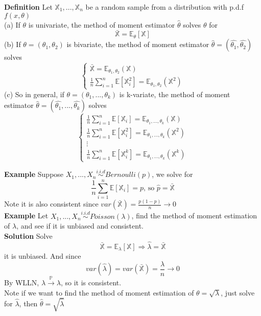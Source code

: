 \documentclass[a4paper,12pt]{article}
\begin{document}
\textbf{Definition} Let $\mathbb{X}_1, ..., \mathbb{X}_n$ be a random sample from a distribution with p.d.f $f(x, \theta)$\\
(a) If $\theta$ is univariate, the method of moment estimator $\hat{\theta}$ solves $\theta$ for $$\bar{\mathbb{X}} = \mathbb{E}_\theta[\mathbb{X}]$$
(b) If $\theta = (\theta_1, \theta_2)$ is bivariate, the method of moment estimator $\hat{\theta} = (\hat{\theta_1}, \hat{\theta_2})$ solves
$$\begin{cases}
\bar{\mathbb{X}} = \mathbb{E}_{\theta_1, \theta_2}(\mathbb{X})\\
\frac{1}{n}\sum_{i=1}^n\mathbb{E}[ \mathbb{X}_i^2] = \mathbb{E}_{\theta_1, \theta_2}(\mathbb{X}^2)
\end{cases}
$$
(c) So in general, if $\theta = (\theta_1, ..., \theta_k)$ is k-variate, the method of moment estimator $\hat{\theta} = (\hat{\theta_1}, ..., \hat{\theta_k})$ solves
$$\begin{cases}
\frac{1}{n}\sum_{i=1}^n\mathbb{E}[ \mathbb{X}_i] = \mathbb{E}_{\theta_1, ...,  \theta_k}(\mathbb{X})\\
\frac{1}{n}\sum_{i=1}^n\mathbb{E}[ \mathbb{X}_i^2] = \mathbb{E}_{\theta_1, ..., \theta_k}(\mathbb{X}^2)\\
\vdots\\
\frac{1}{n}\sum_{i=1}^n\mathbb{E}[ \mathbb{X}_i^k] = \mathbb{E}_{\theta_1, ..., \theta_k}(\mathbb{X}^k)
\end{cases}$$

\textbf{Example} Suppose $X_1, ..., X_n \overset{i.i.d}{\sim} Bernoulli(p)$, we solve for
$$\frac{1}{n}\sum_{i=1}^n\mathbb{E}[ \mathbb{X}_i] = p \text{, so } \hat{p} = \bar{\mathbb{X}}$$
Note it is also consistent since $var(\bar{\mathbb{X}}) = \frac{p(1-p)}{n}\to 0$\\

\textbf{Example} Let $X_1, ..., X_n \overset{i.i.d}{\sim} Poisson(\lambda)$, find the method of moment estimation of $\lambda$, and see if it is unbiased and consistent.\\

\textbf{Solution} Solve
$$\bar{\mathbb{X}} = \mathbb{E}_\lambda[\mathbb{X}] \Rightarrow \hat{\lambda} = \bar{\mathbb{X}}$$
it is unbiased. And since
$$var(\hat{\lambda}) = var( \mathbb{\bar{X}} ) = \frac{\lambda}{n} \to 0$$ By WLLN, $\hat{\lambda} \overset{\mathbb{P}}{\to} \lambda$, so it is consistent.\\

Note if we want to find the method of moment estimation of $\theta = \sqrt{\lambda}$, just solve for $\hat{\lambda}$, then $\hat{\theta} = \sqrt{
\hat{\lambda}}$
\end{document}
